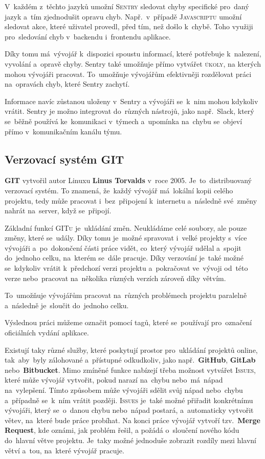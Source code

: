 \documentclass[14pt,a4paper]{article}
\begin{document}
            V~každém z~těchto jazyků umožní \textsc{Sentry} sledovat chyby specifické pro~daný jazyk a~tím zjednodušit opravu chyb.
            Např.~v~případě \textsc{Javascriptu} umožní sledovat akce, které uživatel provedl, před tím, než došlo k~chybě. 
            Toho využiji pro~sledování chyb v~backendu i~frontendu aplikace.

            Díky tomu má~vývojář k~dispozici spoustu informací, které potřebuje k~nalezení, vyvolání a~opravě chyby.
            Sentry také umožňuje přímo vytvářet \textsc{úkoly}, na kterých mohou vývojáři pracovat.
            To~umožňuje vývojářům efektivněji rozdělovat práci na~opravách chyb, které Sentry zachytí.

            Informace navíc zůstanou uloženy v~Sentry a vývojáři se~k~nim mohou kdykoliv vrátit.
            Sentry je možno integrovat do~různých nástrojů, jako např.~Slack, který se~běžně používá ke~komunikaci v~týmech
            a~upomínka na~chybu se~objeví přímo v~komunikačním kanálu týmu.
	
        \subsection{Verzovací systém GIT}
        \textbf{GIT} vytvořil autor Linuxu \textbf{Linus Torvalds} v~roce 2005. Je~to~distribuovaný verzovací systém. To znamená, že~každý vývojář má~lokální kopii celého projektu, tedy může pracovat i~bez~připojení k~internetu a~následně své~změny nahrát na~server, když se~připojí.
        
        Základní funkcí \textsc{GITu} je~ukládání změn. Neukládáme celé soubory, ale pouze změny, které se~udály. Díky tomu je~možné spravovat i~velké projekty s~více vývojáři a~po~dokončení části práce vidět, co~který vývojář udělal a~spojit do~jednoho celku, na~kterém se~dále pracuje. Díky verzování je~také možné se~kdykoliv vrátit k~předchozí verzi projektu a~pokračovat ve~vývoji od~této verze nebo~pracovat na~několika různých verzích zároveň díky větvím.
        
        To~umožňuje vývojářům pracovat na~různých problémech projektu paralelně a~následně je~sloučit do~jednoho celku.

        Výslednou práci můžeme označit pomocí tagů, které se~používají pro~označení oficiálních vydání aplikace.

        Existují taky různé služby, které poskytují prostor pro~ukládání projektů online, tak~aby~byly zálohované a~přístupné odkudkoliv, jako např.~\textbf{GitHub}, \textbf{GitLab} nebo~\textbf{Bitbucket}. Mimo zmíněné funkce nabízejí třeba možnost vytvářet \textsc{Issues}, které může vývojář vytvořit, pokud narazí na~chybu nebo~má~nápad na~vylepšení. Tímto způsobem může vývojáři sdělit svůj nápad nebo~chybu a~případně se~k~ním vrátit později. \textsc{Issues} je~také možné přiřadit konkrétnímu vývojáři, který se~o~danou chybu nebo~nápad postará, a~automaticky vytvořit větev, na~které bude práce probíhat. Na konci práce vývojář vytvoří tzv.~\textbf{Merge Request}, kde oznámi, jak problém řešil, a požádá o~sloučení nového kódu do~hlavní větve projektu. Je~taky možné jednoduše zobrazit rozdíly mezi hlavní větví a~tou, na~které vývojář pracuje.
        
\end{document}
